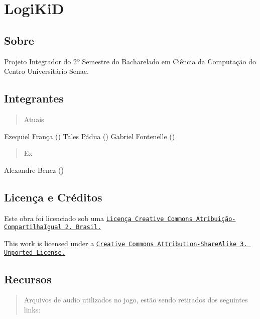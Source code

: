 \section*{Logi\-Ki\-D }



\subsection*{Sobre }

Projeto Integrador do 2º Semestre do Bacharelado em Ciência da Computação do Centro Universitário Senac.

\subsection*{Integrantes }

\begin{quotation}
Atuais

\end{quotation}


Ezequiel França () Tales Pádua () Gabriel Fontenelle ()

\begin{quotation}
Ex

\end{quotation}


Alexandre Bencz ()

\subsection*{Licença e Créditos }



Este obra foi licenciado sob uma \href{http://creativecommons.org/choose/results-one?license_code=by-sa&jurisdiction=br&version=2.5&lang=pt_BR}{\tt Licença Creative Commons Atribuição-\/\-Compartilha\-Igual 2. Brasil.}

This work is licensed under a \href{http://creativecommons.org/licenses/by-sa/3.0/}{\tt Creative Commons Attribution-\/\-Share\-Alike 3. Unported License.}

\subsection*{Recursos }

\begin{quotation}
Arquivos de audio utilizados no jogo, estão sendo retirados dos seguintes links\-:

\end{quotation}


